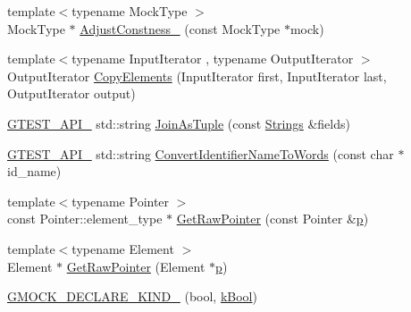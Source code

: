 \begin{DoxyCompactItemize}
\item 
{\footnotesize template$<$typename Mock\+Type $>$ }\\Mock\+Type $\ast$ \mbox{\hyperlink{namespacetesting_1_1internal_a5b32070bcc46f4021c80186e07bc3008}{Adjust\+Constness\+\_\+}} (const Mock\+Type $\ast$mock)
\item 
{\footnotesize template$<$typename Input\+Iterator , typename Output\+Iterator $>$ }\\Output\+Iterator \mbox{\hyperlink{namespacetesting_1_1internal_a9372c12747bcf964aacb1284f8048cae}{Copy\+Elements}} (Input\+Iterator first, Input\+Iterator last, Output\+Iterator output)
\item 
\mbox{\hyperlink{_obj__test_2lib_2googletest-release-1_88_81_2googletest_2include_2gtest_2internal_2gtest-port_8h_aa73be6f0ba4a7456180a94904ce17790}{G\+T\+E\+S\+T\+\_\+\+A\+P\+I\+\_\+}} std\+::string \mbox{\hyperlink{namespacetesting_1_1internal_a4ffe5309bf49f08145ed010a6d244e41}{Join\+As\+Tuple}} (const \mbox{\hyperlink{namespacetesting_1_1internal_a4ad7524c75dfadde584df6d5b4742aa8}{Strings}} \&fields)
\item 
\mbox{\hyperlink{_obj__test_2lib_2googletest-release-1_88_81_2googletest_2include_2gtest_2internal_2gtest-port_8h_aa73be6f0ba4a7456180a94904ce17790}{G\+T\+E\+S\+T\+\_\+\+A\+P\+I\+\_\+}} std\+::string \mbox{\hyperlink{namespacetesting_1_1internal_a0b375abcf3081393e6c420194a541b29}{Convert\+Identifier\+Name\+To\+Words}} (const char $\ast$id\+\_\+name)
\item 
{\footnotesize template$<$typename Pointer $>$ }\\const Pointer\+::element\+\_\+type $\ast$ \mbox{\hyperlink{namespacetesting_1_1internal_ad5e7c706ea3ebdffa1429cf3677062bd}{Get\+Raw\+Pointer}} (const Pointer \&\mbox{\hyperlink{_obj__test_2lib_2googletest-master_2googlemock_2test_2gmock-matchers__test_8cc_a6bc6b007533335efe02bafff799ec64c}{p}})
\item 
{\footnotesize template$<$typename Element $>$ }\\Element $\ast$ \mbox{\hyperlink{namespacetesting_1_1internal_ae9f6499f55e30ff23f9ed914fb8ad597}{Get\+Raw\+Pointer}} (Element $\ast$\mbox{\hyperlink{_obj__test_2lib_2googletest-master_2googlemock_2test_2gmock-matchers__test_8cc_a6bc6b007533335efe02bafff799ec64c}{p}})
\item 
\mbox{\hyperlink{namespacetesting_1_1internal_a20f5584732e44a368e7acf295b639319}{G\+M\+O\+C\+K\+\_\+\+D\+E\+C\+L\+A\+R\+E\+\_\+\+K\+I\+N\+D\+\_\+}} (bool, \mbox{\hyperlink{namespacetesting_1_1internal_aa8747bda20137c9aa7f846dee830e686af3f53b9597c6fc6aefeece472fded3ba}{k\+Bool}})

\end{DoxyCompactItemize}
